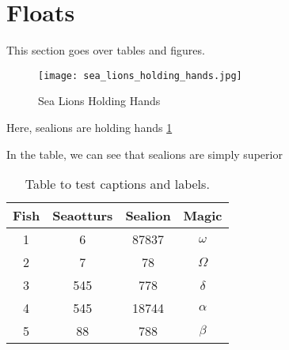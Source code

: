 \section{Floats}
This section goes over tables and figures.

\begin{figure}[H] %
	\centering
	\texttt{[image: sea\_lions\_holding\_hands.jpg]}
	\caption{Sea Lions Holding Hands}
	\label{fig:sealion}
\end{figure}

Here, sealions are holding hands \ref{fig:sealion}

In the table, we can see that sealions are simply superior
\begin{table}[H]
	\centering
	\begin{tabular}{||c c c c||} 
		\hline
		Fish & Seaotturs & Sealion & Magic \\ [0.5ex] 
		\hline\hline
		1 & 6 & 87837 & $\omega$ \\ 
		2 & 7 & 78 & $\Omega$  \\
		3 & 545 & 778 & $\delta$  \\
		4 & 545 & 18744 & $\alpha$  \\
		5 & 88 & 788 & $\beta$  \\ [1ex] 
		\hline
	\end{tabular}
	\caption{Table to test captions and labels. \cite{Lions2001}}
	\label{table:1}
\end{table}
